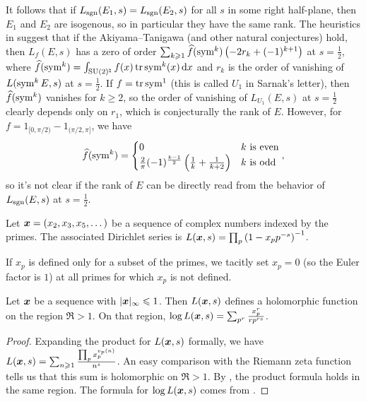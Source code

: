 It follows that if $L_{\operatorname{sgn}}(E_1,s) = L_{\operatorname{sgn}}(E_2,s)$ for all $s$ in some 
right half-plane, then $E_1$ and $E_2$ 
are isogenous, so in particular they have the same rank. The heuristics in 
\cite{sarnak-2007} suggest that if the Akiyama--Tanigawa (and other natural 
conjectures) hold, then $L_f(E,s)$ has a zero of order 
$\sum_{k\geqslant 1} \widehat f(\operatorname{sym}^k) \left(-2 r_k + (-1)^{k+1}\right)$ at 
$s = \frac 1 2$, where 
$\widehat f(\operatorname{sym}^k) = \int_{\operatorname{SU}(2)^\natural} f(x) \operatorname{tr}\operatorname{sym}^k(x)\, \mathrm{d} x$ and 
$r_k$ is the order of vanishing of $L(\operatorname{sym}^k E,s)$ at $s = \frac 1 2$. If 
$f = \operatorname{tr}\operatorname{sym}^1$ (this is called $U_1$ in Sarnak's letter), then
$\widehat f(\operatorname{sym}^k)$ vanishes for $k\geqslant 2$, so the order of 
vanishing of $L_{U_1}(E,s)$ at $s = \frac 1 2$ clearly depends only on $r_1$, 
which is conjecturally the rank of $E$. However, for 
$f = 1_{[0,\pi/2)} - 1_{(\pi/2,\pi]}$, we have 
\[
	\widehat f(\operatorname{sym}^k) = 
	\begin{cases}
		0 & \text{$k$ is even} \\
		\frac 2 \pi (-1)^{\frac{k-1}{2}} \left(\frac 1 k + \frac{1}{k+2}\right) & \text{$k$ is odd} 
	\end{cases} ,
\]
so it's not clear if the rank of $E$ can be directly read from the behavior 
of $L_{\operatorname{sgn}}(E,s)$ at $s = \frac 1 2$. 

\begin{definition}
Let ${\boldsymbol x}=(x_2,x_3,x_5,\dots)$ be a sequence of complex numbers indexed by the 
primes. The associated Dirichlet series is 
$L({\boldsymbol x},s) = \prod_p \left(1- x_p p^{-s}\right)^{-1}$. 
\end{definition}

If $x_p$ is defined only for a subset of the primes, we tacitly set $x_p = 0$ 
(so the Euler factor is $1$) at all primes for which $x_p$ is not defined. 

\begin{lemma}
Let ${\boldsymbol x}$ be a sequence with $|{\boldsymbol x}|_\infty \leqslant 1$. Then $L({\boldsymbol x},s)$ 
defines a holomorphic function on the region $\Re > 1$. On that region, 
$\log L({\boldsymbol x},s) = \sum_{p^r} \frac{x_p^r}{r p^{r s}}$. 
\end{lemma}
\begin{proof}
Expanding the product for $L({\boldsymbol x},s)$ formally, we have 
$L({\boldsymbol x},s) = \sum_{n\geqslant 1} \frac{\prod_p x_p^{v_p(n)}}{n^s}$. 
An easy comparison with the Riemann zeta function tells us that this sum 
is holomorphic on $\Re > 1$. By \cite[Th.~11.7]{apostol-1976}, the 
product formula holds in the same region. The formula for $\log L({\boldsymbol x},s)$ 
comes from \cite[11.9 Ex.~2]{apostol-1976}. 
\end{proof}

